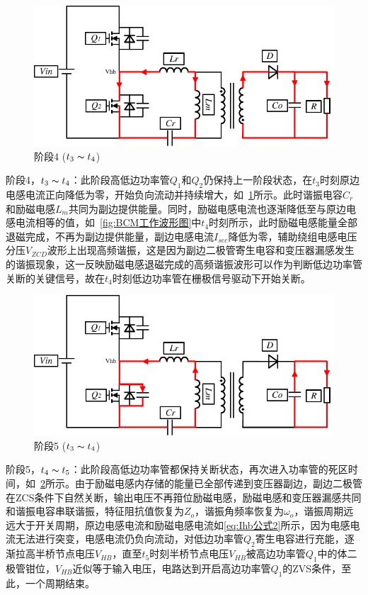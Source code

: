 \begin{figure}[htbp] 
    \centering
    \includegraphics[width=0.6\linewidth]{figures/工作原理4.pdf}
    \caption{阶段4 ($t_3 \thicksim t_4$)}
    \label{fig:工作原理4}
\end{figure}

阶段4，$t_3 \thicksim t_4$：此阶段高低边功率管$Q_1$和$Q_2$仍保持上一阶段状态，在$t_3$时刻原边电感电流正向降低为零，开始负向流动并持续增大，如~\ref{fig:工作原理4}所示。此时谐振电容$C_r$和励磁电感$L_m$共同为副边提供能量。同时，励磁电感电流也逐渐降低至与原边电感电流相等的值，如~\ref{fig:BCM工作波形图}中$t_4$时刻所示，此时励磁电感能量全部退磁完成，不再为副边提供能量，副边电感电流$I_{sec}$降低为零，辅助绕组电感电压分压$V_{ZCD}$波形上出现高频谐振，这是因为副边二极管寄生电容和变压器漏感发生的谐振现象，这一反映励磁电感退磁完成的高频谐振波形可以作为判断低边功率管关断的关键信号，故在$t_4$时刻低边功率管在栅极信号驱动下开始关断。

\begin{figure}[htbp] 
    \centering
    \includegraphics[width=0.6\linewidth]{figures/工作原理5.pdf}
    \caption{阶段5 ($t_3 \thicksim t_4$)}
    \label{fig:工作原理5}
\end{figure}
                
阶段5，$t_4 \thicksim t_5$：此阶段高低边功率管都保持关断状态，再次进入功率管的死区时间，如~\ref{fig:工作原理5}所示。由于励磁电感内存储的能量已全部传递到变压器副边，副边二极管在ZCS条件下自然关断，输出电压不再箝位励磁电感，励磁电感和变压器漏感共同和谐振电容串联谐振，特征阻抗值恢复为$Z_o$，谐振角频率恢复为$\omega_o$，谐振周期远远大于开关周期，原边电感电流和励磁电感电流如\eqref{eq:Ihb公式2}所示，因为电感电流无法进行突变，电感电流仍负向流动，对低边功率管$Q_2$寄生电容进行充能，逐渐拉高半桥节点电压$V_{HB}$，直至$t_5$时刻半桥节点电压$V_{HB}$被高边功率管$Q_1$中的体二极管钳位，$V_{HB}$近似等于输入电压，电路达到开启高边功率管$Q_1$的ZVS条件，至此，一个周期结束。

